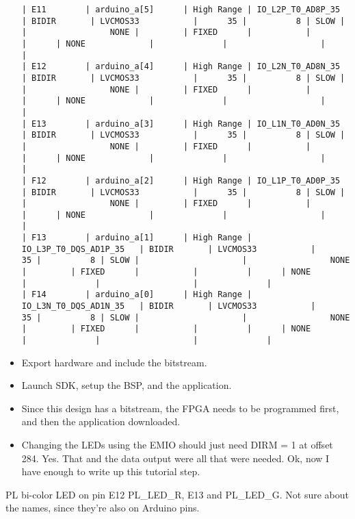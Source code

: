 \begin{itemize}
\begin{verbatim}
| E11        | arduino_a[5]      | High Range | IO_L2P_T0_AD8P_35       | BIDIR       | LVCMOS33           |      35 |          8 | SLOW |                     |                 NONE |         | FIXED      |           |          |      | NONE             |              |                   |              |
| E12        | arduino_a[4]      | High Range | IO_L2N_T0_AD8N_35       | BIDIR       | LVCMOS33           |      35 |          8 | SLOW |                     |                 NONE |         | FIXED      |           |          |      | NONE             |              |                   |              |
| E13        | arduino_a[3]      | High Range | IO_L1N_T0_AD0N_35       | BIDIR       | LVCMOS33           |      35 |          8 | SLOW |                     |                 NONE |         | FIXED      |           |          |      | NONE             |              |                   |              |
| F12        | arduino_a[2]      | High Range | IO_L1P_T0_AD0P_35       | BIDIR       | LVCMOS33           |      35 |          8 | SLOW |                     |                 NONE |         | FIXED      |           |          |      | NONE             |              |                   |              |
| F13        | arduino_a[1]      | High Range | IO_L3P_T0_DQS_AD1P_35   | BIDIR       | LVCMOS33           |      35 |          8 | SLOW |                     |                 NONE |         | FIXED      |           |          |      | NONE             |              |                   |              |
| F14        | arduino_a[0]      | High Range | IO_L3N_T0_DQS_AD1N_35   | BIDIR       | LVCMOS33           |      35 |          8 | SLOW |                     |                 NONE |         | FIXED      |           |          |      | NONE             |              |                   |              |
\end{verbatim}

\item Export hardware and include the bitstream.
\item Launch SDK, setup the BSP, and the application.
\item Since this design has a bitstream, the FPGA needs to be programmed first,
and then the application downloaded.

\item Changing the LEDs using the EMIO should just need DIRM = 1 at offset 284.
Yes. That and the data output were all that were needed.
Ok, now I have enough to write up this tutorial step.
\end{itemize}

PL bi-color LED on pin E12 PL\_LED\_R, E13 and PL\_LED\_G. Not sure about the names,
since they're also on Arduino pins.


